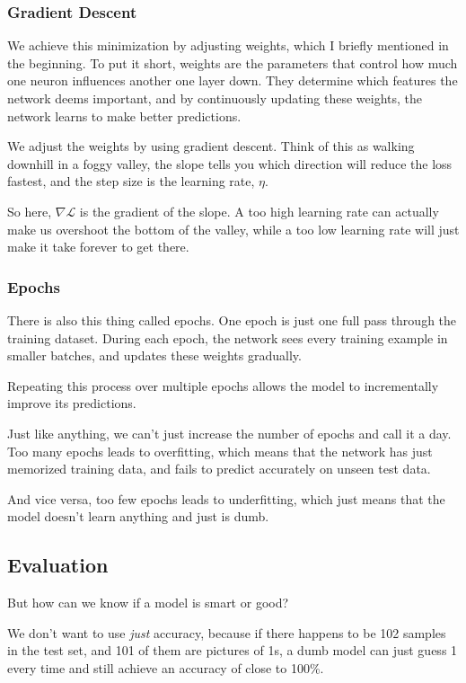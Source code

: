 \documentclass{article}
\begin{document}
\subsubsection{Gradient Descent}

We achieve this minimization by adjusting weights, which I briefly mentioned in the beginning. To put it short, weights are the parameters that control how much one neuron influences another one layer down. They determine which features the network deems important, and by continuously updating these weights, the network learns to make better predictions. 

We adjust the weights by using gradient descent. Think of this as walking downhill in a foggy valley, the slope tells you which direction will reduce the loss fastest, and the step size is the learning rate, $\eta$.

So here, $\nabla \mathcal{L}$ is the gradient of the slope. A too high learning rate can actually make us overshoot the bottom of the valley, while a too low learning rate will just make it take forever to get there. 

\subsubsection{Epochs}

There is also this thing called epochs. One epoch is just one full pass through the training dataset. During each epoch, the network sees every training example in smaller batches, and updates these weights gradually. 

Repeating this process over multiple epochs allows the model to incrementally improve its predictions. 

Just like anything, we can't just increase the number of epochs and call it a day. Too many epochs leads to overfitting, which means that the network has just memorized training data, and fails to predict accurately on unseen test data. 

And vice versa, too few epochs leads to underfitting, which just means that the model doesn't learn anything and just is dumb. 

\subsection{Evaluation}

But how can we know if a model is smart or good?

We don't want to use \textit{just} accuracy, because if there happens to be 102 samples in the test set, and 101 of them are pictures of 1s, a dumb model can just guess 1 every time and still achieve an accuracy of close to 100\%.
\end{document}
